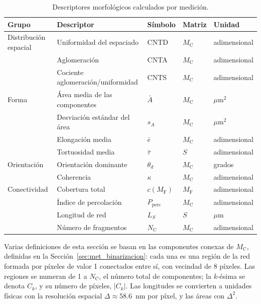 \begin{table}[H]
\centering
\caption{Descriptores morfológicos calculados por medición.}
\label{tab:descriptores}
\small
\begin{tabular}{@{}l l l l l@{}}
\toprule
\textbf{Grupo} & \textbf{Descriptor} & \textbf{Símbolo} & \textbf{Matriz} & \textbf{Unidad} \\
\midrule
Distribución espacial & Uniformidad del espaciado & CNTD & $M_{\mathrm{C}}$ & adimensional \\
 & Aglomeración & CNTA & $M_{\mathrm{C}}$ & adimensional \\
 & Cociente aglomeración/uniformidad & CNTS & $M_{\mathrm{C}}$ & adimensional \\
\midrule
Forma & Área media de las componentes & $\bar A$ & $M_{\mathrm{C}}$ & $\mu$m$^2$ \\
 & Desviación estándar del área & $s_A$ & $M_{\mathrm{C}}$ & $\mu$m$^2$ \\
 & Elongación media & $\bar e$ & $M_{\mathrm{C}}$ & adimensional \\
 & Tortuosidad media & $\bar\tau$ & $S$ & adimensional \\
\midrule
Orientación & Orientación dominante & $\theta_d$ & $M_{\mathrm{C}}$ & grados \\
 & Coherencia & $\kappa$ & $M_{\mathrm{C}}$ & adimensional \\
\midrule
Conectividad & Cobertura total & $c(M_{\mathrm{F}})$ & $M_{\mathrm{F}}$ & adimensional \\
 & Índice de percolación & $P_{\mathrm{perc}}$ & $M_{\mathrm{C}}$ & adimensional \\
 & Longitud de red & $L_S$ & $S$ & $\mu$m \\
 & Número de fragmentos & $N_{\mathrm{C}}$ & $M_{\mathrm{C}}$ & adimensional \\
\bottomrule
\end{tabular}
\end{table}

Varias definiciones de esta sección se basan en las componentes conexas de $M_{\mathrm{C}}$, definidas en la Sección~\ref{sec:met_binarizacion}: cada una es una región de la red formada por píxeles de valor 1 conectados entre sí, con vecindad de 8 píxeles. Las regiones se numeran de 1 a $N_{\mathrm{C}}$, el número total de componentes; la $k$-ésima se denota $C_k$, y su número de píxeles, $|C_k|$. Las longitudes se convierten a unidades físicas con la resolución espacial $\Delta \approx 58.6$~nm por píxel, y las áreas con $\Delta^2$.


